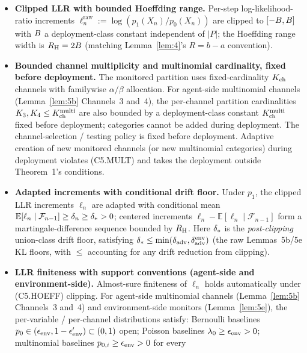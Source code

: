 \begin{theorem}
\begin{enumerate}
  \begin{itemize}
  \item[\textbf{(C5.HOEFF)}] \textbf{Clipped LLR with bounded
    Hoeffding range.}  Per-step log-likelihood-ratio increments
    $\ell_n^{\mathrm{raw}} := \log(p_1(X_n)/p_0(X_n))$ are clipped
    to $[-B, B]$ with $B$ a deployment-class constant
    independent of $|P|$; the Hoeffding range width is
    $R_{\mathrm{H}} = 2B$ (matching Lemma~\ref{lem:4}'s $R = b - a$
    convention).
  \item[\textbf{(C5.MULT)}] \textbf{Bounded channel multiplicity
    and multinomial cardinality, fixed before deployment.}  The
    monitored partition uses fixed-cardinality $K_{\mathrm{ch}}$ channels
    with familywise $\alpha/\beta$ allocation.  For agent-side
    multinomial channels (Lemma~\ref{lem:5b} Channels~3 and~4),
    the per-channel partition cardinalities $K_3, K_4 \leq
    K_{\mathrm{ch}}^{\mathrm{multi}}$ are also bounded by a deployment-class constant
    $K_{\mathrm{ch}}^{\mathrm{multi}}$ fixed before deployment; categories cannot be
    added during deployment.  The channel-selection / testing
    policy is fixed before deployment.  Adaptive creation of new
    monitored channels (or new multinomial categories) during
    deployment violates (C5.MULT) and takes the deployment outside
    Theorem~1's conditions.
  \item[\textbf{(C5.IID)}] \textbf{Adapted increments with
    conditional drift floor.}  Under $p_1$, the clipped LLR
    increments $\ell_n$ are adapted with conditional mean
    $\mathbb{E}[\ell_n \mid \mathcal{F}_{n-1}] \geq \delta_n \geq
    \delta_{*} > 0$; centered increments $\ell_n - \mathbb{E}[\ell_n
    \mid \mathcal{F}_{n-1}]$ form a martingale-difference sequence
    bounded by $R_{\mathrm{H}}$.  Here $\delta_{*}$ is the \emph{post-clipping}
    union-class drift floor, satisfying $\delta_{*} \leq \min(\delta_{\mathrm{adv}},
    \delta_{\mathrm{adv}}^{\mathrm{env}})$ (the raw Lemmas~5b/5e KL
    floors, with $\leq$ accounting for any drift reduction from
    clipping).
  \item[\textbf{(C5.SUPP)}] \textbf{LLR finiteness with support
    conventions (agent-side and environment-side).}  Almost-sure
    finiteness of $\ell_n$ holds automatically under (C5.HOEFF)
    clipping.  For agent-side multinomial channels
    (Lemma~\ref{lem:5b} Channels~3 and~4) and environment-side
    monitors (Lemma~\ref{lem:5e}), the per-variable / per-channel
    distributions satisfy:
    Bernoulli baselines $p_0 \in (\epsilon_{\mathrm{env}}, 1 - \epsilon_{\mathrm{env}}') \subset (0,
    1)$ open; Poisson baselines $\lambda_0 \geq \epsilon_{\mathrm{env}} > 0$;
    multinomial baselines $p_{0, i} \geq \epsilon_{\mathrm{env}} > 0$ for every

\end{itemize}
\end{enumerate}
\end{theorem}

